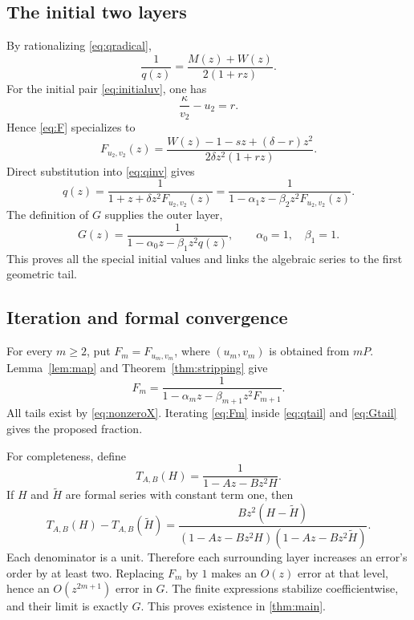 \documentclass[11pt,letterpaper]{article}
\numberwithin{equation}{section}
\theoremstyle{definition}
\theoremstyle{remark}
\begin{document}
\subsection{The initial two layers}
By rationalizing \eqref{eq:qradical},
\begin{equation}\label{eq:qinv}
 \frac1{q(z)}=\frac{M(z)+W(z)}{2(1+rz)}.
\end{equation}
For the initial pair \eqref{eq:initialuv}, one has
\[
 \frac{\kappa}{v_2}-u_2=r.
\]
Hence \eqref{eq:F} specializes to
\begin{equation}\label{eq:F2}
 F_{u_2,v_2}(z)=
 \frac{W(z)-1-sz+(\delta-r)z^2}{2\delta z^2(1+rz)}.
\end{equation}
Direct substitution into \eqref{eq:qinv} gives
\begin{equation}\label{eq:qtail}
 q(z)=\frac1{1+z+\delta z^2F_{u_2,v_2}(z)}
     =\frac1{1-\alpha_1z-\beta_2z^2F_{u_2,v_2}(z)}.
\end{equation}
The definition of $G$ supplies the outer layer,
\begin{equation}\label{eq:Gtail}
 G(z)=\frac1{1-\alpha_0z-\beta_1z^2q(z)},
 \qquad \alpha_0=1,\quad\beta_1=1.
\end{equation}
This proves all the special initial values and links the algebraic series
to the first geometric tail.

\subsection{Iteration and formal convergence}
For every $m\ge2$, put $F_m=F_{u_m,v_m}$, where
$(u_m,v_m)$ is obtained from $mP$. Lemma~\ref{lem:map} and
Theorem~\ref{thm:stripping} give
\begin{equation}\label{eq:Fm}
 F_m=\frac1{1-\alpha_mz-\beta_{m+1}z^2F_{m+1}}.
\end{equation}
All tails exist by \eqref{eq:nonzeroX}. Iterating \eqref{eq:Fm} inside
\eqref{eq:qtail} and \eqref{eq:Gtail} gives the proposed fraction.

For completeness, define
\[
 T_{A,B}(H)=\frac1{1-Az-Bz^2H}.
\]
If $H$ and $\widetilde H$ are formal series with constant term one, then
\begin{equation}\label{eq:valuation}
 T_{A,B}(H)-T_{A,B}(\widetilde H)
 =\frac{Bz^2(H-\widetilde H)}
 {(1-Az-Bz^2H)(1-Az-Bz^2\widetilde H)}.
\end{equation}
Each denominator is a unit. Therefore each surrounding layer increases
an error's order by at least two. Replacing $F_m$ by $1$ makes an
$O(z)$ error at that level, hence an $O(z^{2m+1})$ error in $G$.
The finite expressions stabilize coefficientwise, and their limit is
exactly $G$. This proves existence in \cref{thm:main}.
\end{document}
